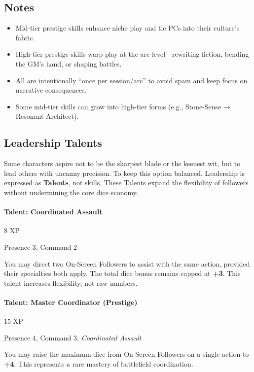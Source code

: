 \documentclass[12pt]{book}
\begin{document}
\subsection*{Notes}
\begin{itemize}
  \item Mid-tier prestige skills enhance niche play and tie PCs into their culture’s fabric.  
  \item High-tier prestige skills warp play at the arc level—rewriting fiction, bending the GM’s hand, or shaping battles.  
  \item All are intentionally “once per session/arc” to avoid spam and keep focus on narrative consequences.  
  \item Some mid-tier skills can grow into high-tier forms (e.g., Stone-Sense → Resonant Architect).  
\end{itemize}

\subsection*{Leadership Talents}

Some characters aspire not to be the sharpest blade or the keenest wit, but to lead others with uncanny precision. To keep this option balanced, Leadership is expressed as \textbf{Talents}, not skills. These Talents expand the flexibility of followers without undermining the core dice economy.

\paragraph{Talent: Coordinated Assault}
\begin{description}[leftmargin=2cm]
  \item[Cost:] 8 XP
  \item[Requirements:] Presence 3, Command 2
  \item[Effect:] You may direct two On-Screen Followers to assist with the same action, provided their specialties both apply. The total dice bonus remains capped at \textbf{+3}. This talent increases flexibility, not raw numbers.
\end{description}

\paragraph{Talent: Master Coordinator (Prestige)}
\begin{description}[leftmargin=2cm]
  \item[Cost:] 15 XP
  \item[Requirements:] Presence 4, Command 3, \emph{Coordinated Assault}
  \item[Effect:] You may raise the maximum dice from On-Screen Followers on a single action to \textbf{+4}. This represents a rare mastery of battlefield coordination.
\end{description}
\end{document}
